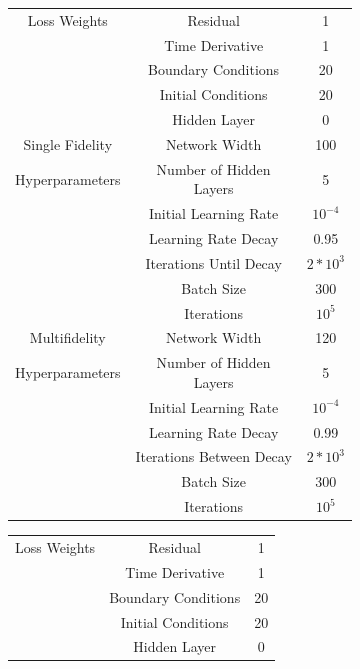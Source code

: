 \documentclass[12pt]{article}
\begin{document}
\begin{figure}[H]
\centering
    \begin{subfigure}{0.49\textwidth}
        \scriptsize
	\begin{center}
	\begin{tabular}{|c|c|c|} 
 	\hline
	 Loss Weights & Residual				& 1 \\ 
	        		& Time Derivative 	& 1 \\ 
	        		& Boundary Conditions	& 20 \\
	 			& Initial Conditions		& 20 \\ 
	 			& Hidden Layer	& 0 \\
	\hline
	Single Fidelity	& Network Width			& 100 \\
	Hyperparameters & Number of Hidden Layers & 5 \\
					& Initial Learning Rate & $10^{-4}$ \\
					& Learning Rate Decay & 0.95 \\
					& Iterations Until Decay & $2*10^3$ \\
					& Batch Size & 300 \\
					& Iterations & $10^5$ \\
 	\hline
	Multifidelity	& Network Width			& 120 \\
	Hyperparameters & Number of Hidden Layers & 5 \\
					& Initial Learning Rate & $10^{-4}$ \\
					& Learning Rate Decay & 0.99 \\
					& Iterations Between Decay & $2*10^3$ \\
					& Batch Size & 300 \\
					& Iterations & $10^5$ \\
 	\hline
	\end{tabular}
	\end{center}
	\caption{}
     \label{subfig:a}
    \end{subfigure}
	\hfill
    \begin{subfigure}{0.49\textwidth}
        \scriptsize
	\begin{center}
	\begin{tabular}{|c|c|c|} 
 	\hline
	 Loss Weights & Residual				& 1 \\ 
	        		& Time Derivative 	& 1 \\ 
	        		& Boundary Conditions	& 20 \\
	 			& Initial Conditions		& 20 \\ 
	 			& Hidden Layer	& 0 \\

\end{tabular}
\end{center}
\end{subfigure}
\end{figure}
\end{document}
